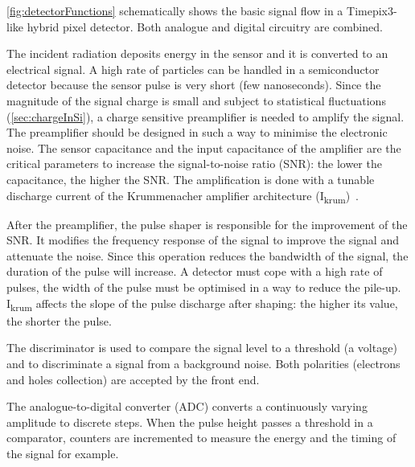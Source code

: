 \cref{fig:detectorFunctions} schematically shows the basic signal flow
in a Timepix3-like hybrid pixel detector. Both analogue and
digital circuitry are combined. 

The incident radiation deposits energy in the sensor and it is
converted to an electrical signal. A high rate of particles can be
handled in a semiconductor detector because the sensor pulse is very
short (few nanoseconds). Since the magnitude of the signal charge is
small and subject to statistical fluctuations (\cref{sec:chargeInSi}),
a charge sensitive preamplifier is needed to amplify the signal. The
preamplifier should be designed in such a way to minimise the
electronic noise. The sensor capacitance and the input capacitance of
the amplifier are the critical parameters to increase the
signal-to-noise ratio (SNR): the lower the capacitance, the higher the
SNR. The amplification is done with a tunable discharge current of the
Krummenacher amplifier architecture
(I\textsubscript{krum})~\cite{KRUMMENACHER1991527}.

After the preamplifier, the pulse shaper is responsible for the
improvement of the SNR. It modifies the frequency response of the
signal to improve the signal and attenuate the noise. Since this
operation reduces the bandwidth of the signal, the duration of the
pulse will increase. A detector must cope with a high rate of pulses,
the width of the pulse must be optimised in a way to reduce the
pile-up. I\textsubscript{krum} affects the slope of the pulse
discharge after shaping: the higher its value, the shorter the
pulse.

The discriminator is used to compare the signal level to a
threshold (a voltage) and to discriminate a signal from a background
noise. Both polarities (electrons and holes collection) are accepted
by the front end.

The analogue-to-digital converter (ADC) converts a continuously varying
amplitude to discrete steps. When the pulse height passes a threshold
in a comparator, counters are incremented to measure the energy and
the timing of the signal for example.

